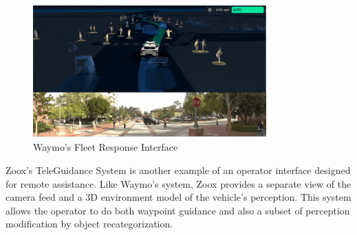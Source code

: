 \begin{figure}
    \includegraphics[width=0.8\textwidth]{figures/waymo.png}
    \centering
    \caption{Waymo's Fleet Response Interface \cite{waymo2024fleetresponse}}
    \label{fig:Waymo}
\end{figure}

Zoox's TeleGuidance System \cite{zoox2024teleguidance} is another example of an operator interface designed for remote assistance. Like Waymo’s system, Zoox provides a separate view of the camera feed and a 3D environment model of the vehicle’s perception. This system allows the operator to do both waypoint guidance
 \cite{corridor} and also a subset of perception modification \cite{Feiler2021ThePM} by object recategorization.

